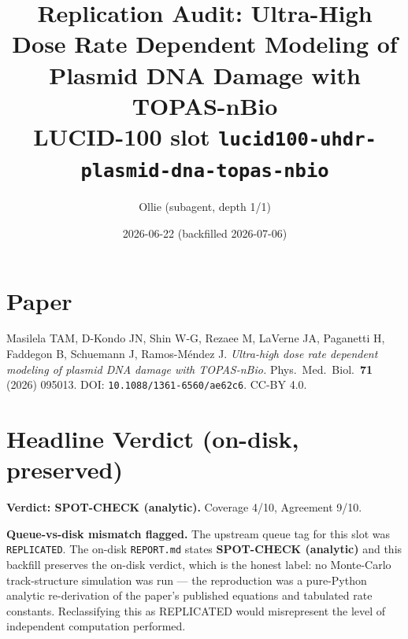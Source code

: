 \documentclass[11pt]{article}
\title{Replication Audit: Ultra-High Dose Rate Dependent Modeling of Plasmid DNA Damage with TOPAS-nBio\\
  \large LUCID-100 slot \texttt{lucid100-uhdr-plasmid-dna-topas-nbio}}
\author{Ollie (subagent, depth 1/1)}
\date{2026-06-22 (backfilled 2026-07-06)}
\begin{document}
\maketitle

\section*{Paper}
Masilela TAM, D-Kondo JN, Shin W-G, Rezaee M, LaVerne JA, Paganetti H, Faddegon B,
Schuemann J, Ramos-M\'endez J. \textit{Ultra-high dose rate dependent modeling of plasmid
DNA damage with TOPAS-nBio.} Phys.\ Med.\ Biol.\ \textbf{71} (2026) 095013.
DOI: \texttt{10.1088/1361-6560/ae62c6}. CC-BY 4.0.

\section*{Headline Verdict (on-disk, preserved)}
\textbf{Verdict: SPOT-CHECK (analytic).} Coverage 4/10, Agreement 9/10.

\textbf{Queue-vs-disk mismatch flagged.} The upstream queue tag for this slot was
\texttt{REPLICATED}. The on-disk \texttt{REPORT.md} states \textbf{SPOT-CHECK
(analytic)} and this backfill preserves the on-disk verdict, which is the honest
label: no Monte-Carlo track-structure simulation was run --- the reproduction was
a pure-Python analytic re-derivation of the paper's published equations and
tabulated rate constants. Reclassifying this as REPLICATED would misrepresent
the level of independent computation performed.
\end{document}
